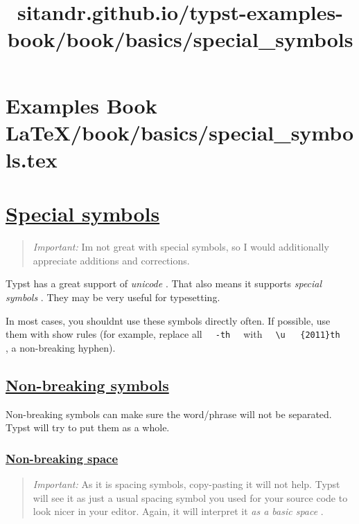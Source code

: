 \section{Examples Book LaTeX/book/basics/special_symbols.tex}
\title{sitandr.github.io/typst-examples-book/book/basics/special_symbols}

\section{\texorpdfstring{\hyperref[special-symbols]{Special
symbols}}{Special symbols}}\label{special-symbols}

\begin{quote}
\emph{Important:} I\textquotesingle m not great with special symbols, so
I would additionally appreciate additions and corrections.
\end{quote}

Typst has a great support of \emph{unicode} . That also means it
supports \emph{special symbols} . They may be very useful for
typesetting.

In most cases, you shouldn\textquotesingle t use these symbols directly
often. If possible, use them with show rules (for example, replace all
\texttt{\ }{\texttt{\ -th\ }}\texttt{\ } with
\texttt{\ }{\texttt{\ \textbackslash{}u\ }}\texttt{\ }{\texttt{\ \{2011\}th\ }}\texttt{\ }
, a non-breaking hyphen).

\subsection{\texorpdfstring{\hyperref[non-breaking-symbols]{Non-breaking
symbols}}{Non-breaking symbols}}\label{non-breaking-symbols}

Non-breaking symbols can make sure the word/phrase will not be
separated. Typst will try to put them as a whole.

\subsubsection{\texorpdfstring{\hyperref[non-breaking-space]{Non-breaking
space}}{Non-breaking space}}\label{non-breaking-space}

\begin{quote}
\emph{Important:} As it is spacing symbols, copy-pasting it will not
help. Typst will see it as just a usual spacing symbol you used for your
source code to look nicer in your editor. Again, it will interpret it
\emph{as a basic space} .
\end{quote}

